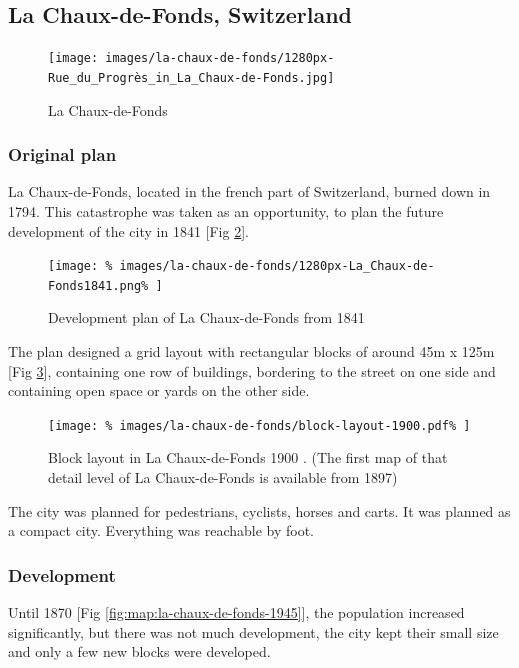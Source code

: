 \documentclass{article}
\begin{document}
		\subsection{La Chaux-de-Fonds, Switzerland}		
		\begin{figure}[H]
	 		\texttt{[image: images/la-chaux-de-fonds/1280px-Rue\_du\_Progrès\_in\_La\_Chaux-de-Fonds.jpg]}
 			\caption{La Chaux-de-Fonds \cite{Wikimedia:RueDuProgressLaChauxDeFonds}}
 			\label{fig:img:la-chaux-de-fonds}
	 	\end{figure}
		
		\begin{multicols}{2}
	      \raggedcolumns
		
			\subsubsection{Original plan}
			La Chaux-de-Fonds, located in the french part of Switzerland, burned down in 1794.
			This catastrophe was taken as an opportunity, to plan the future development of the city in 1841 [Fig \ref{fig:map:plan-la-chaux-de-fonds-1841}].
		
			\begin{figure}[H]
				\texttt{[image: \%
					images/la-chaux-de-fonds/1280px-La\_Chaux-de-Fonds1841.png\%
				]}
				\caption{Development plan of La Chaux-de-Fonds from 1841 \cite{Wikimedia:LaChauxDeFonds1841}}
				\label{fig:map:plan-la-chaux-de-fonds-1841}
			\end{figure}
			
			The plan designed a grid layout with rectangular blocks of around 45m x 125m [Fig \ref{fig:img:la-chaux-de-fonds-block-layout-1900}], containing one row of buildings, bordering to the street on one side and containing open space or yards on the other side.
			
			\begin{figure}[H]
				\texttt{[image: \%
					images/la-chaux-de-fonds/block-layout-1900.pdf\%
				]}
				\caption{Block layout in La Chaux-de-Fonds 1900  \cite{MapGeoAdmin:LaChauxDeFonds}. (The first map of that detail level of La Chaux-de-Fonds is available from 1897)}
				\label{fig:img:la-chaux-de-fonds-block-layout-1900}
			\end{figure}
			
			The city was planned for pedestrians, cyclists, horses and carts.
			It was planned as a compact city. Everything was reachable by foot.
			
			
			\subsubsection{Development}
			Until 1870 [Fig \ref{fig:map:la-chaux-de-fonds-1945}], the population increased significantly, but there was not much development, the city kept their small size and only a few new blocks were developed.
			

\end{multicols}
\end{document}
